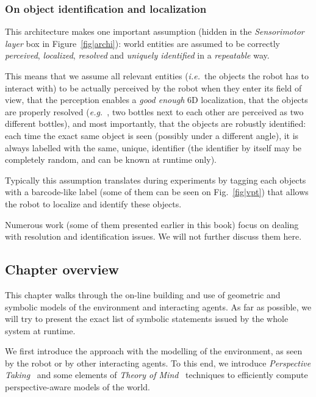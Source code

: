 \documentclass{svmult}
\newcommand{\ie}{{\textit{i.e.~}}}
\newcommand{\eg}{{\textit{e.g.~}}}
\begin{document}

\subsubsection*{On object identification and localization}

This architecture makes one important assumption (hidden in the
\emph{Sensorimotor layer} box in Figure~\ref{fig|archi}): world entities are
assumed to be correctly \emph{perceived}, \emph{localized}, \emph{resolved} and
\emph{uniquely identified} in a \emph{repeatable} way.

This means that we assume all relevant entities (\ie the objects the robot has
to interact with) to be actually perceived by the robot when they enter its
field of view, that the perception enables a \emph{good enough} 6D
localization, that the objects are properly resolved (\eg, two bottles next to
each other are perceived as two different bottles), and most importantly, that
the objects are robustly identified: each time the exact same object is seen
(possibly under a different angle), it is always labelled with the same,
unique, identifier (the identifier by itself may be completely random, and can
be known at runtime only).

Typically this assumption translates during experiments by tagging each objects
with a barcode-like label (some of them can be seen on Fig.~\ref{fig|vpt}) that
allows the robot to localize and identify these objects.

Numerous work  (some of them presented earlier in
this book) focus on dealing with resolution and identification issues.  We
will not further discuss them here.



\subsection{Chapter overview}

This chapter walks through the on-line building and use of geometric and
symbolic models of the environment and interacting agents. As far as possible,
we will try to present the exact list of symbolic statements issued by the
whole system at runtime.

We first introduce the approach with the modelling of the environment, as seen
by the robot or by other interacting agents. To this end, we introduce
\emph{Perspective Taking}~\cite{Flavell1992,Tversky1999} and some elements of
\emph{Theory of Mind}~\cite{Scassellati2002} techniques to efficiently compute perspective-aware models of
the world. 
\end{document}
